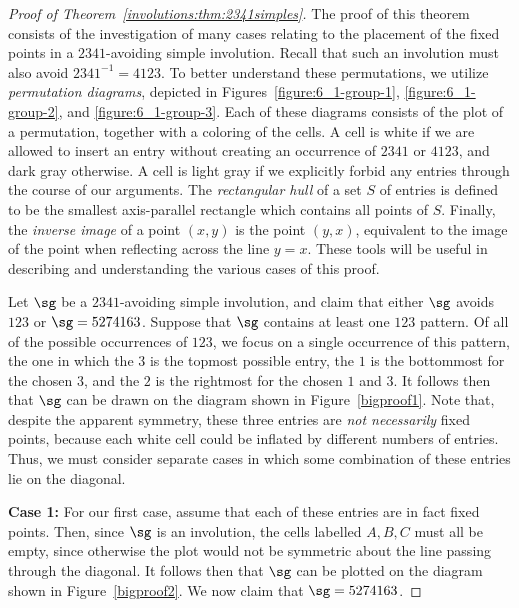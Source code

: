 \documentclass[12pt,twoside]{memoir}
\begin{document}
        \begin{proof}[Proof of Theorem~\ref{involutions:thm:2341simples}] 

          The proof of this theorem consists of the investigation of many cases
          relating to the placement of the fixed points in a $2341$-avoiding
          simple involution. Recall that such an involution must also avoid
          $2341^{-1} = 4123$. To better understand these permutations, we utilize
          \emph{permutation diagrams}, depicted in
          Figures~\ref{figure:6_1-group-1}, \ref{figure:6_1-group-2}, and
          \ref{figure:6_1-group-3}.
          Each of these diagrams consists of the plot of a permutation, together
          with a coloring of the cells. A cell is white if we are allowed to
          insert an entry without creating an occurrence of $2341$ or $4123$, and
          dark gray otherwise. A cell is light gray if we explicitly forbid any
          entries through the course of our arguments. The \emph{rectangular
          hull} of a set $S$ of entries is defined to be the smallest
          axis-parallel rectangle which contains all points of $S$. Finally, the
          \emph{inverse image} of a point $(x,y)$ is the point $(y,x)$,
          equivalent to the image of the point when reflecting across the line
          $y=x$. These tools will be useful in describing and understanding the
          various cases of this proof. 
            
          Let $\sg$ be a $2341$-avoiding simple involution, and claim that either
          $\sg$ avoids $123$ or $\sg = 5274163$. Suppose that $\sg$ contains at
          least one $123$ pattern. 
          Of all of the possible occurrences of $123$, 
          we focus on a single occurrence of this
          pattern, the one in which the $3$ is the topmost possible entry, the
          $1$ is the bottommost for the chosen $3$, and the $2$ is the rightmost
          for the chosen $1$ and $3$. It follows then that $\sg$ can be drawn on
          the diagram shown in Figure~\ref{bigproof1}. Note that, despite the
          apparent symmetry, these three entries are \emph{not necessarily} fixed
          points, because each white cell could be inflated by different numbers
          of entries. Thus, we must consider separate cases in which some
          combination of these entries lie on the diagonal. 

          


          \textbf{Case 1:}
          For our first case, assume that each of these entries are in fact fixed
          points. Then, since $\sg$ is an involution, the cells labelled $A,B,C$
          must all be empty, since otherwise the plot would not be symmetric
          about the line passing through the diagonal. It follows then that $\sg$
          can be plotted on the diagram shown in Figure~\ref{bigproof2}. 
          We now claim that $\sg = 5274163$. 
          

\end{proof}
\end{document}
